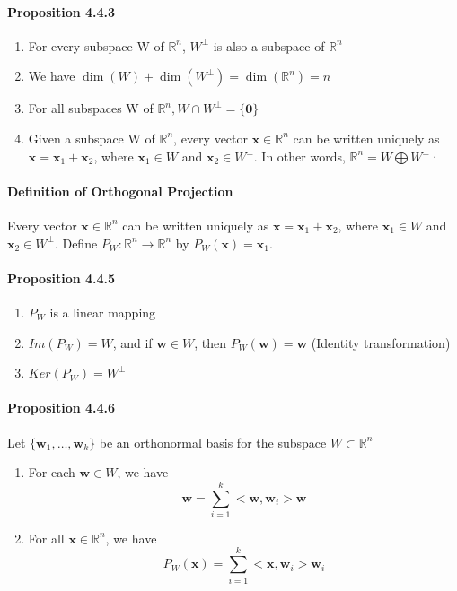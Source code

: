 \documentclass[11pt]{article}
\newcommand{\tb}[1]{\textbf{#1}}
\newcommand{\real}[0]{\mathbb{R}}
\newcommand{\vx}[0]{\tb{x}}
\newcommand{\vo}[0]{\tb{0}}
\newcommand{\vw}[0]{\tb{w}}
\begin{document}
{\paragraph{Proposition 4.4.3}
\begin{enumerate}
	\item For every subspace W of $\real^n$, $W^\perp$ is also a subspace of $\real^n$
	\item We have $\dim(W) + \dim(W^\perp) = \dim(\real^n) = n$
	\item For all subspaces W of $\real^n, W \cap W^\perp = \{\vo\}$
	\item Given a subspace W of $\real^n$, every vector $\vx \in \real^n$ can be written uniquely as $\vx = \vx_1 + \vx_2$, where $\vx_1 \in W$ and $\vx_2 \in W^\perp$. In other words, $\real^n = W \bigoplus W^\perp$· 
\end{enumerate}

\paragraph{Definition of Orthogonal Projection}
Every vector $\vx \in \real^n$ can be written uniquely as $\vx = \vx_1 + \vx_2$, where $\vx_1 \in W$ and $\vx_2 \in W^\perp$. Define $P_W: \real^n \rightarrow \real^n$ by $P_W(\vx) = \vx_1$.

\paragraph{Proposition 4.4.5}
\begin{enumerate}
	\item $P_W$ is a linear mapping
	\item $Im(P_W) = W$, and if $\vw \in W$, then $P_W(\vw) = \vw$ (Identity transformation)
	\item $Ker(P_W) = W^\perp$
\end{enumerate}

\paragraph{Proposition 4.4.6} Let $\{ \vw_1,\hdots,\vw_k\}$ be an orthonormal basis for the subspace $W \subset \real^n$
\begin{enumerate}
	\item For each $\vw \in W$, we have $$\vw = \sum_{i=1}^k <\vw,\vw_i>\vw$$
	\item For all $\vx \in \real^n$, we have $$P_W(\vx) = \sum_{i=1}^k <\vx,\vw_i>\vw_i$$
\end{enumerate}
}
\end{document}
